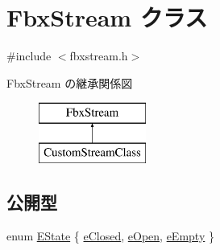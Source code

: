 \hypertarget{class_fbx_stream}{}\section{Fbx\+Stream クラス}
\label{class_fbx_stream}


{\ttfamily \#include $<$fbxstream.\+h$>$}

Fbx\+Stream の継承関係図\begin{figure}[H]
\begin{center}
\leavevmode
\includegraphics[height=2.000000cm]{class_fbx_stream}
\end{center}
\end{figure}
\subsection*{公開型}
\begin{DoxyCompactItemize}
\item 
enum \hyperlink{class_fbx_stream_adc469d38eb30339fa4190eb6c66ec8f7}{E\+State} \{ \hyperlink{class_fbx_stream_adc469d38eb30339fa4190eb6c66ec8f7a960b577245aea4e5fb73b4c8430f3830}{e\+Closed}, 
\hyperlink{class_fbx_stream_adc469d38eb30339fa4190eb6c66ec8f7a87c8f9d5a45dc6123fadc18e5a6e3195}{e\+Open}, 
\hyperlink{class_fbx_stream_adc469d38eb30339fa4190eb6c66ec8f7a3187889296102999260bf0cff24078ac}{e\+Empty}
 \}
\end{DoxyCompactItemize}
